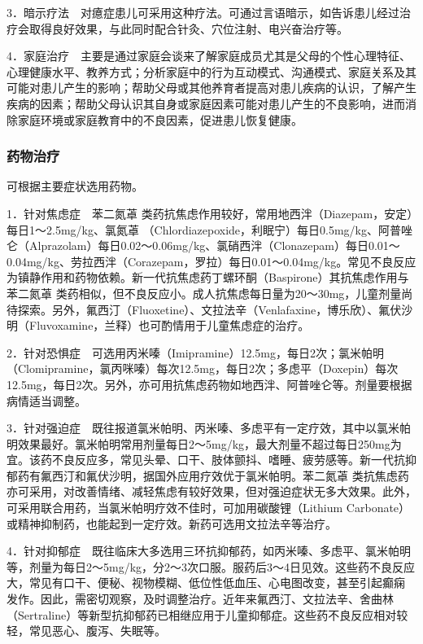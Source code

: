 3．暗示疗法　对癔症患儿可采用这种疗法。可通过言语暗示，如告诉患儿经过治疗会取得良好效果，与此同时配合针灸、穴位注射、电兴奋治疗等。

4．家庭治疗　主要是通过家庭会谈来了解家庭成员尤其是父母的个性心理特征、心理健康水平、教养方式；分析家庭中的行为互动模式、沟通模式、家庭关系及其可能对患儿产生的影响；帮助父母或其他养育者提高对患儿疾病的认识，了解产生疾病的因素；帮助父母认识其自身或家庭因素可能对患儿产生的不良影响，进而消除家庭环境或家庭教育中的不良因素，促进患儿恢复健康。

\subsubsection{药物治疗}

可根据主要症状选用药物。

1．针对焦虑症　苯二氮䓬
类药抗焦虑作用较好，常用地西泮（Diazepam，安定）每日1～2.5mg/kg、氯氮䓬
（Chlordiazepoxide，利眠宁）每日0.5mg/kg、阿普唑仑（Alprazolam）每日0.02～0.06mg/kg、氯硝西泮（Clonazepam）每日0.01～0.04mg/kg、劳拉西泮（Corazepam，罗拉）每日0.01～0.04mg/kg。常见不良反应为镇静作用和药物依赖。新一代抗焦虑药丁螺环酮（Baspirone）其抗焦虑作用与苯二氮䓬
类药相似，但不良反应小。成人抗焦虑每日量为20～30mg，儿童剂量尚待探索。另外，氟西汀（Fluoxetine）、文拉法辛（Venlafaxine，博乐欣）、氟伏沙明（Fluvoxamine，兰释）也可酌情用于儿童焦虑症的治疗。

2．针对恐惧症　可选用丙米嗪（Imipramine）12.5mg，每日2次；氯米帕明（Clomipramine，氯丙咪嗪）每次12.5mg，每日2次；多虑平（Doxepin）每次12.5mg，每日2次。另外，亦可用抗焦虑药物如地西泮、阿普唑仑等。剂量要根据病情适当调整。

3．针对强迫症　既往报道氯米帕明、丙米嗪、多虑平有一定疗效，其中以氯米帕明效果最好。氯米帕明常用剂量每日2～5mg/kg，最大剂量不超过每日250mg为宜。该药不良反应多，常见头晕、口干、肢体颤抖、嗜睡、疲劳感等。新一代抗抑郁药有氟西汀和氟伏沙明，据国外应用疗效优于氯米帕明。苯二氮䓬
类抗焦虑药亦可采用，对改善情绪、减轻焦虑有较好效果，但对强迫症状无多大效果。此外，可采用联合用药，当氯米帕明疗效不佳时，可加用碳酸锂（Lithium
Carbonate）或精神抑制药，也能起到一定疗效。新药可选用文拉法辛等治疗。

4．针对抑郁症　既往临床大多选用三环抗抑郁药，如丙米嗪、多虑平、氯米帕明等，剂量为每日2～5mg/kg，分2～3次口服。服药后3～4日见效。这些药不良反应大，常见有口干、便秘、视物模糊、低位性低血压、心电图改变，甚至引起癫痫
发作。因此，需密切观察，及时调整治疗。近年来氟西汀、文拉法辛、舍曲林（Sertraline）等新型抗抑郁药已相继应用于儿童抑郁症。这些药不良反应相对较轻，常见恶心、腹泻、失眠等。

